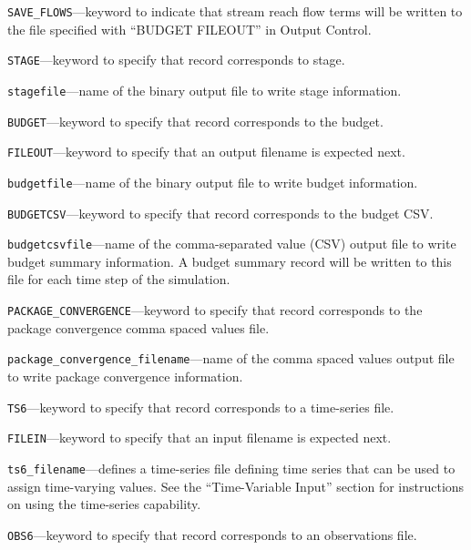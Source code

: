\begin{description}
\item \texttt{SAVE\_FLOWS}---keyword to indicate that stream reach flow terms will be written to the file specified with ``BUDGET FILEOUT'' in Output Control.

\item \texttt{STAGE}---keyword to specify that record corresponds to stage.

\item \texttt{stagefile}---name of the binary output file to write stage information.

\item \texttt{BUDGET}---keyword to specify that record corresponds to the budget.

\item \texttt{FILEOUT}---keyword to specify that an output filename is expected next.

\item \texttt{budgetfile}---name of the binary output file to write budget information.

\item \texttt{BUDGETCSV}---keyword to specify that record corresponds to the budget CSV.

\item \texttt{budgetcsvfile}---name of the comma-separated value (CSV) output file to write budget summary information.  A budget summary record will be written to this file for each time step of the simulation.

\item \texttt{PACKAGE\_CONVERGENCE}---keyword to specify that record corresponds to the package convergence comma spaced values file.

\item \texttt{package\_convergence\_filename}---name of the comma spaced values output file to write package convergence information.

\item \texttt{TS6}---keyword to specify that record corresponds to a time-series file.

\item \texttt{FILEIN}---keyword to specify that an input filename is expected next.

\item \texttt{ts6\_filename}---defines a time-series file defining time series that can be used to assign time-varying values. See the ``Time-Variable Input'' section for instructions on using the time-series capability.

\item \texttt{OBS6}---keyword to specify that record corresponds to an observations file.


\end{description}
